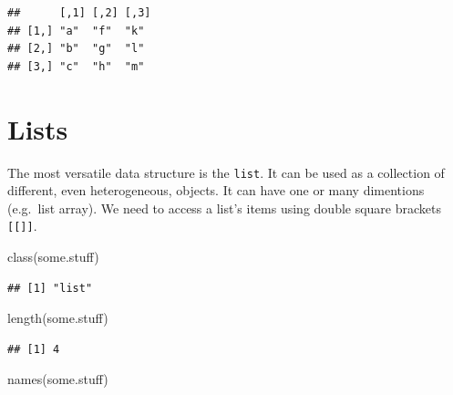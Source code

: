\documentclass[
]{book}
\newenvironment{Shaded}{\begin{snugshade}}{\end{snugshade}}
\newcommand{\AttributeTok}[1]{\textcolor[rgb]{0.77,0.63,0.00}{#1}}
\newcommand{\DecValTok}[1]{\textcolor[rgb]{0.00,0.00,0.81}{#1}}
\newcommand{\FunctionTok}[1]{\textcolor[rgb]{0.00,0.00,0.00}{#1}}
\newcommand{\NormalTok}[1]{#1}
\newcommand{\OtherTok}[1]{\textcolor[rgb]{0.56,0.35,0.01}{#1}}
\newcommand{\SpecialCharTok}[1]{\textcolor[rgb]{0.00,0.00,0.00}{#1}}
\begin{document}
\begin{verbatim}
##      [,1] [,2] [,3]
## [1,] "a"  "f"  "k" 
## [2,] "b"  "g"  "l" 
## [3,] "c"  "h"  "m"
\end{verbatim}

\hypertarget{lists}{%
\section*{Lists}\label{lists}}

The most versatile data structure is the \texttt{list}. It can be used as a collection of different, even heterogeneous, objects. It can have one or many dimentions (e.g.~list array). We need to access a list's items using double square brackets \texttt{{[}{[}{]}{]}}.

\begin{Shaded}
\end{Shaded}

\begin{Shaded}
\begin{Highlighting}[]
\FunctionTok{class}\NormalTok{(some.stuff)   }
\end{Highlighting}
\end{Shaded}

\begin{verbatim}
## [1] "list"
\end{verbatim}

\begin{Shaded}
\begin{Highlighting}[]
\FunctionTok{length}\NormalTok{(some.stuff)  }
\end{Highlighting}
\end{Shaded}

\begin{verbatim}
## [1] 4
\end{verbatim}

\begin{Shaded}
\begin{Highlighting}[]
\FunctionTok{names}\NormalTok{(some.stuff)   }
\end{Highlighting}
\end{Shaded}
\end{document}
